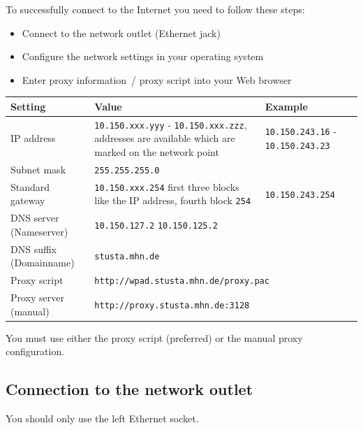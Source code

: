 \documentclass[a4paper,12pt]{scrartcl}
\begin{document}
To successfully connect to the Internet you need to follow these steps:
\begin{itemize}
    \item Connect to the network outlet (Ethernet jack)
    \item Configure the network settings in your operating system
    \item Enter proxy information~/ proxy script into your Web browser
\end{itemize}


\begin{center}
  \begin{tabularx}{\linewidth}{|lXp{.2\linewidth}|}
    \hline
    Setting & Value & Example \\
    \hline \hline
    IP address & \nolinkurl{10.150.xxx.yyy} - \nolinkurl{10.150.xxx.zzz}, \newline 8 addresses are available which are marked on the network point & \nolinkurl{10.150.243.16} - \nolinkurl{10.150.243.23} \\
    \hline
    Subnet mask & \nolinkurl{255.255.255.0} & \\
    \hline
    Standard gateway & \nolinkurl{10.150.xxx.254} \newline first three blocks like the IP address, fourth block \nolinkurl{254} & \nolinkurl{10.150.243.254} \\
    \hline
    DNS server (Nameserver) & \nolinkurl{10.150.127.2} \newline \nolinkurl{10.150.125.2} & \\
    \hline
    DNS suffix (Domainname) & \nolinkurl{stusta.mhn.de} & \\
    \hline
    Proxy script & \multicolumn{2}{l|}{\nolinkurl{http://wpad.stusta.mhn.de/proxy.pac}} \\
    \hline
    Proxy server (manual) & \multicolumn{2}{l|}{\nolinkurl{http://proxy.stusta.mhn.de:3128}} \\
    \hline
  \end{tabularx}
\end{center}

You must use either the proxy script (preferred) or the manual proxy configuration.

\subsection*{Connection to the network outlet}

You should only use the left Ethernet socket.
\end{document}

